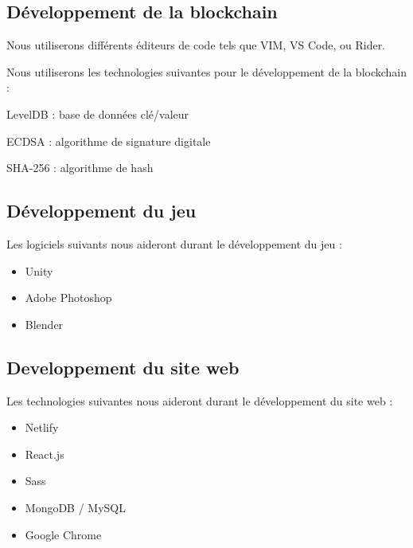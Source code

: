 \documentclass{article}
\begin{document}
\subsection{Développement de la blockchain}
Nous utiliserons différents éditeurs de code tels que VIM, VS Code, ou Rider.

Nous utiliserons les technologies suivantes pour le développement de la blockchain :
\begin{itemize}
\begin{samepage}
    \item LevelDB : base de données clé/valeur
    \item ECDSA : algorithme de signature digitale
    \item SHA-256 : algorithme de hash
\end{samepage}
\end{itemize}

\subsection{Développement du jeu}

Les logiciels suivants nous aideront durant le développement du jeu :
\begin{itemize}
    \item Unity
    \item Adobe Photoshop
    \item Blender
\end{itemize}

\subsection{Developpement du site web}
Les technologies suivantes nous aideront durant le développement du site web :
\begin{itemize}
    \item Netlify
    \item React.js
    \item Sass
    \item MongoDB / MySQL
    \item Google Chrome
\end{itemize}
\end{document}
